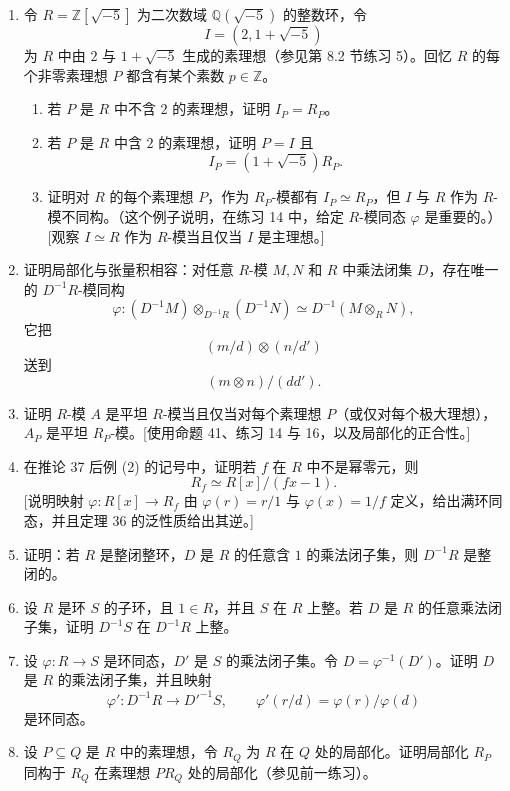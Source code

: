 \begin{enumerate}[label=\arabic*.]
	\item 令 $R=\mathbb Z[\sqrt{-5}]$ 为二次数域 $\mathbb Q(\sqrt{-5})$ 的整数环，令
	\[
	I=(2,1+\sqrt{-5})
	\]
	为 $R$ 中由 $2$ 与 $1+\sqrt{-5}$ 生成的素理想（参见第 8.2 节练习 5）。回忆 $R$ 的每个非零素理想 $P$ 都含有某个素数 $p\in\mathbb Z$。
	\begin{enumerate}[label=(\alph*)]
		\item 若 $P$ 是 $R$ 中不含 $2$ 的素理想，证明 $I_P=R_P$。
		\item 若 $P$ 是 $R$ 中含 $2$ 的素理想，证明 $P=I$ 且
		\[
		I_P=(1+\sqrt{-5})R_P.
		\]
		\item 证明对 $R$ 的每个素理想 $P$，作为 $R_P$-模都有 $I_P\simeq R_P$，但 $I$ 与 $R$ 作为 $R$-模不同构。（这个例子说明，在练习 14 中，给定 $R$-模同态 $\varphi$ 是重要的。）[观察 $I\simeq R$ 作为 $R$-模当且仅当 $I$ 是主理想。]
	\end{enumerate}
	
	\item 证明局部化与张量积相容：对任意 $R$-模 $M,N$ 和 $R$ 中乘法闭集 $D$，存在唯一的 $D^{-1}R$-模同构
	\[
	\varphi:(D^{-1}M)\otimes_{D^{-1}R}(D^{-1}N)\simeq D^{-1}(M\otimes_R N),
	\]
	它把
	\[
	(m/d)\otimes(n/d')
	\]
	送到
	\[
	(m\otimes n)/(dd').
	\]
	
	\item 证明 $R$-模 $A$ 是平坦 $R$-模当且仅当对每个素理想 $P$（或仅对每个极大理想），$A_P$ 是平坦 $R_P$-模。[使用命题 41、练习 14 与 16，以及局部化的正合性。]
	
	\item 在推论 37 后例 (2) 的记号中，证明若 $f$ 在 $R$ 中不是幂零元，则
	\[
	R_f\simeq R[x]/(fx-1).
	\]
	[说明映射 $\varphi:R[x]\to R_f$ 由 $\varphi(r)=r/1$ 与 $\varphi(x)=1/f$ 定义，给出满环同态，并且定理 36 的泛性质给出其逆。]
	
	\item 证明：若 $R$ 是整闭整环，$D$ 是 $R$ 的任意含 $1$ 的乘法闭子集，则 $D^{-1}R$ 是整闭的。
	
	\item 设 $R$ 是环 $S$ 的子环，且 $1\in R$，并且 $S$ 在 $R$ 上整。若 $D$ 是 $R$ 的任意乘法闭子集，证明 $D^{-1}S$ 在 $D^{-1}R$ 上整。
	
	\item 设 $\varphi:R\to S$ 是环同态，$D'$ 是 $S$ 的乘法闭子集。令 $D=\varphi^{-1}(D')$。证明 $D$ 是 $R$ 的乘法闭子集，并且映射
	\[
	\varphi':D^{-1}R\longrightarrow {D'}^{-1}S,
	\qquad
	\varphi'(r/d)=\varphi(r)/\varphi(d)
	\]
	是环同态。
	
	\item 设 $P\subseteq Q$ 是 $R$ 中的素理想，令 $R_Q$ 为 $R$ 在 $Q$ 处的局部化。证明局部化 $R_P$ 同构于 $R_Q$ 在素理想 $PR_Q$ 处的局部化（参见前一练习）。
	

\end{enumerate}
